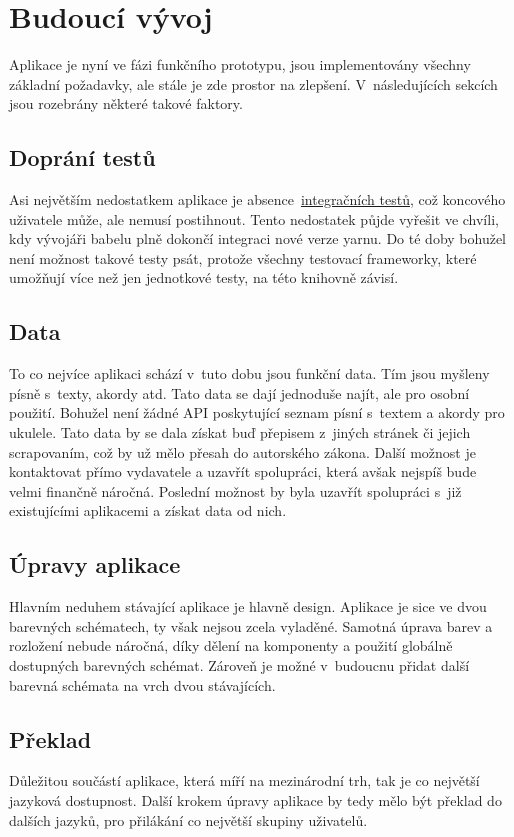 \section{Budoucí vývoj}
\label{sc:upcomming_development}
Aplikace je nyní ve fázi funkčního prototypu, jsou implementovány všechny základní požadavky, ale stále je zde prostor na zlepšení. V~následujících sekcích jsou rozebrány některé takové faktory.

\subsection{Doprání testů}
Asi největším nedostatkem aplikace je absence~\hyperref[sc:unit_tests]{integračních testů}, což koncového uživatele může, ale nemusí postihnout. Tento nedostatek půjde vyřešit ve chvíli, kdy vývojáři babelu plně dokončí integraci nové verze yarnu. Do té doby bohužel není možnost takové testy psát, protože všechny testovací frameworky, které umožňují více než jen jednotkové testy, na této knihovně závisí.

\subsection{Data}
To co nejvíce aplikaci schází v~tuto dobu jsou funkční data. Tím jsou myšleny písně s~texty, akordy atd. Tato data se dají jednoduše najít, ale pro osobní použití. Bohužel není žádné API poskytující seznam písní s~textem a akordy pro ukulele. Tato data by se dala získat buď přepisem z~jiných stránek či jejich scrapovaním, což by už mělo přesah do autorského zákona. Další možnost je kontaktovat přímo vydavatele a uzavřít spolupráci, která avšak nejspíš bude velmi finančně náročná. Poslední možnost by byla uzavřít spolupráci s~již existujícími aplikacemi a získat data od nich.

\subsection{Úpravy aplikace}
Hlavním neduhem stávající aplikace je hlavně design. Aplikace je sice ve dvou barevných schématech, ty však nejsou zcela vyladěné. Samotná úprava barev a rozložení nebude náročná, díky dělení na komponenty a použití globálně dostupných barevných schémat. Zároveň je možné v~budoucnu přidat další barevná schémata na vrch dvou stávajících.

\subsection{Překlad}
Důležitou součástí aplikace, která míří na mezinárodní trh, tak je co největší jazyková dostupnost. Další krokem úpravy aplikace by tedy mělo být překlad do dalších jazyků, pro přilákání co největší skupiny uživatelů.


